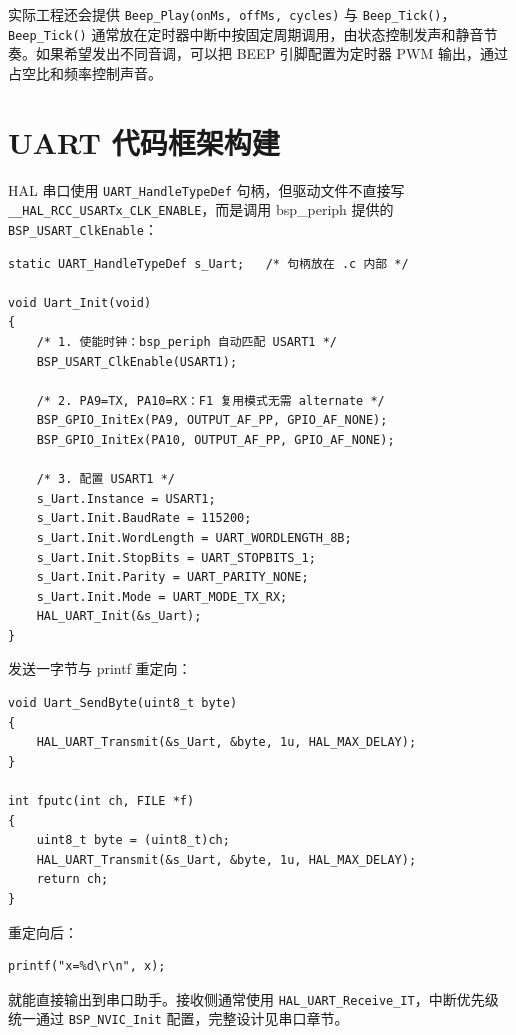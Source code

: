 实际工程还会提供 \texttt{Beep\_Play(onMs, offMs, cycles)} 与 \texttt{Beep\_Tick()}， \texttt{Beep\_Tick()} 通常放在定时器中断中按固定周期调用，由状态控制发声和静音节奏。如果希望发出不同音调，可以把 BEEP 引脚配置为定时器 PWM 输出，通过占空比和频率控制声音。

\section{UART 代码框架构建}

HAL 串口使用 \texttt{UART\_HandleTypeDef} 句柄，但驱动文件不直接写 \texttt{\_\_HAL\_RCC\_USARTx\_CLK\_ENABLE}，而是调用 bsp\_periph 提供的 \texttt{BSP\_USART\_ClkEnable}：

\begin{lstlisting}[style=c]
static UART_HandleTypeDef s_Uart;   /* 句柄放在 .c 内部 */

void Uart_Init(void)
{
    /* 1. 使能时钟：bsp_periph 自动匹配 USART1 */
    BSP_USART_ClkEnable(USART1);

    /* 2. PA9=TX, PA10=RX：F1 复用模式无需 alternate */
    BSP_GPIO_InitEx(PA9, OUTPUT_AF_PP, GPIO_AF_NONE);
    BSP_GPIO_InitEx(PA10, OUTPUT_AF_PP, GPIO_AF_NONE);

    /* 3. 配置 USART1 */
    s_Uart.Instance = USART1;
    s_Uart.Init.BaudRate = 115200;
    s_Uart.Init.WordLength = UART_WORDLENGTH_8B;
    s_Uart.Init.StopBits = UART_STOPBITS_1;
    s_Uart.Init.Parity = UART_PARITY_NONE;
    s_Uart.Init.Mode = UART_MODE_TX_RX;
    HAL_UART_Init(&s_Uart);
}
\end{lstlisting}

发送一字节与 printf 重定向：

\begin{lstlisting}[style=c]
void Uart_SendByte(uint8_t byte)
{
    HAL_UART_Transmit(&s_Uart, &byte, 1u, HAL_MAX_DELAY);
}

int fputc(int ch, FILE *f)
{
    uint8_t byte = (uint8_t)ch;
    HAL_UART_Transmit(&s_Uart, &byte, 1u, HAL_MAX_DELAY);
    return ch;
}
\end{lstlisting}

重定向后：

\begin{lstlisting}[style=c]
printf("x=%d\r\n", x);
\end{lstlisting}

就能直接输出到串口助手。接收侧通常使用 \texttt{HAL\_UART\_Receive\_IT}，中断优先级统一通过 \texttt{BSP\_NVIC\_Init} 配置，完整设计见串口章节。

